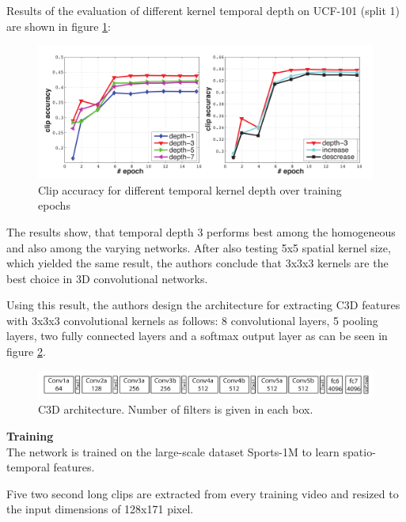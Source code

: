 Results of the evaluation of different kernel temporal depth on UCF-101 (split 1) are shown in figure \ref{fig:c3d_temporaldeptheval}:

\begin{figure}[H]
    \centering
    \includegraphics[width=\textwidth]{img_deep/c3d_temporaldeptheval}
    \caption{Clip accuracy for different temporal kernel depth over training epochs \cite{tran_learning_2015}}
    \label{fig:c3d_temporaldeptheval}
\end{figure}

The results show, that temporal depth 3 performs best among the homogeneous and also among the varying networks.
After also testing 5x5 spatial kernel size, which yielded the same result, the authors conclude that 3x3x3 kernels are the best choice in 3D convolutional networks.

Using this result, the authors design the architecture for extracting C3D features with 3x3x3 convolutional kernels as follows: 8 convolutional layers, 5 pooling layers, two fully connected layers and a softmax output layer as can be seen in figure \ref{fig:c3d_architecture}.

\begin{figure}[H]
    \centering
    \includegraphics[width=\textwidth]{img_deep/c3d_architecture}
    \caption{C3D architecture. Number of filters is given in each box. \cite{tran_learning_2015}}
    \label{fig:c3d_architecture}
\end{figure}

\textbf{Training} \\
The network is trained on the large-scale dataset Sports-1M to learn spatio-temporal features.

Five two second long clips are extracted from every training video and resized to the input dimensions of 128x171 pixel.

